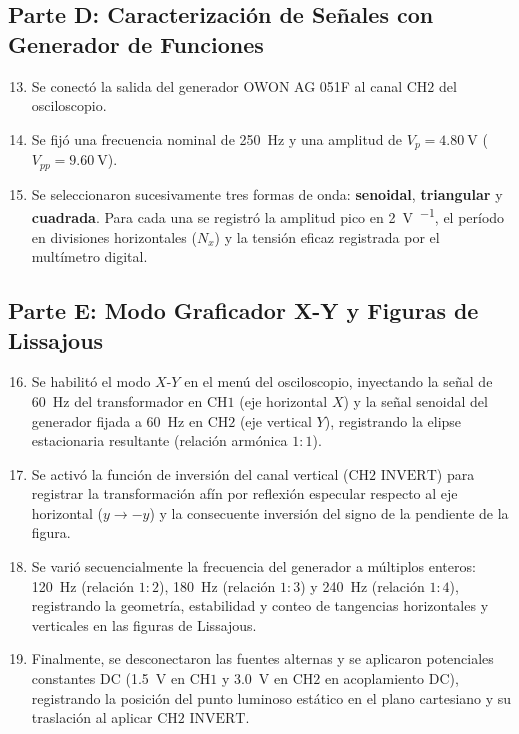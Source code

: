 \subsection{Parte D: Caracterización de Señales con Generador de Funciones}
\begin{enumerate}
    \setcounter{enumi}{12}
    \item Se conectó la salida del generador OWON AG 051F al canal $\text{CH2}$ del osciloscopio.
    \item Se fijó una frecuencia nominal de \qty{250}{\hertz} y una amplitud de $V_p = \qty{4,80}{\volt}$ ($V_{pp} = \qty{9,60}{\volt}$).
    \item Se seleccionaron sucesivamente tres formas de onda: \textbf{senoidal}, \textbf{triangular} y \textbf{cuadrada}. Para cada una se registró la amplitud pico en \qty{2}{\volt\per\division}, el período en divisiones horizontales ($N_x$) y la tensión eficaz registrada por el multímetro digital.
\end{enumerate}

\subsection{Parte E: Modo Graficador X-Y y Figuras de Lissajous}
\begin{enumerate}
    \setcounter{enumi}{15}
    \item Se habilitó el modo $X$-$Y$ en el menú del osciloscopio, inyectando la señal de \qty{60}{\hertz} del transformador en $\text{CH1}$ (eje horizontal $X$) y la señal senoidal del generador fijada a \qty{60}{\hertz} en $\text{CH2}$ (eje vertical $Y$), registrando la elipse estacionaria resultante (relación armónica $1:1$).
    \item Se activó la función de inversión del canal vertical ($\text{CH2 INVERT}$) para registrar la transformación afín por reflexión especular respecto al eje horizontal ($y \to -y$) y la consecuente inversión del signo de la pendiente de la figura.
    \item Se varió secuencialmente la frecuencia del generador a múltiplos enteros: \qty{120}{\hertz} (relación $1:2$), \qty{180}{\hertz} (relación $1:3$) y \qty{240}{\hertz} (relación $1:4$), registrando la geometría, estabilidad y conteo de tangencias horizontales y verticales en las figuras de Lissajous.
    \item Finalmente, se desconectaron las fuentes alternas y se aplicaron potenciales constantes DC (\qty{1,5}{\volt} en $\text{CH1}$ y \qty{3,0}{\volt} en $\text{CH2}$ en acoplamiento $\text{DC}$), registrando la posición del punto luminoso estático en el plano cartesiano y su traslación al aplicar $\text{CH2 INVERT}$.
\end{enumerate}

